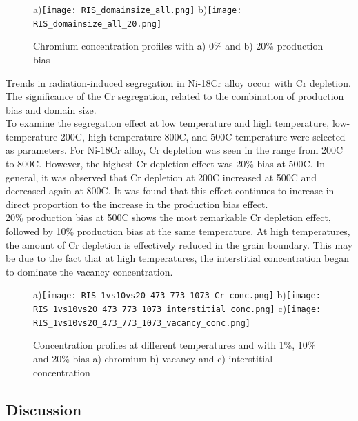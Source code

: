 \documentclass[utf8]{frontiersSCNS} %
\begin{document}
    \begin{figure}[h!]  %
        \centering
        a)\texttt{[image: RIS\_domainsize\_all.png]}
        b)\texttt{[image: RIS\_domainsize\_all\_20.png]}
        \caption{Chromium concentration profiles with a) 0\% and b) 20\% production bias }
        \label{figure:RIS_Cr_concentration}
    \end{figure}


        Trends in radiation-induced segregation in Ni-18Cr alloy occur with Cr depletion. The significance of the Cr segregation, related to the combination of production bias and domain size.\\

        To examine the segregation effect at low temperature and high temperature, low-temperature 200\degree C, high-temperature 800\degree C, and 500\degree C temperature were selected as parameters. For Ni-18Cr alloy, Cr depletion was seen in the range from 200\degree C to 800\degree C. However, the highest Cr depletion effect was 20\% bias at 500\degree C. In general, it was observed that Cr depletion at 200\degree C increased at 500\degree C and decreased again at 800\degree C. It was found that this effect continues to increase in direct proportion to the increase in the production bias effect.\\

        20\% production bias at 500\degree C shows the most remarkable Cr depletion effect, followed by 10\%  production bias at the same temperature. At high temperatures, the amount of Cr depletion is effectively reduced in the grain boundary. This may be due to the fact that at high temperatures, the interstitial concentration began to dominate the vacancy concentration.

    \begin{figure}[h!]  %
        \centering
        a)\texttt{[image: RIS\_1vs10vs20\_473\_773\_1073\_Cr\_conc.png]}
        b)\texttt{[image: RIS\_1vs10vs20\_473\_773\_1073\_interstitial\_conc.png]}
        c)\texttt{[image: RIS\_1vs10vs20\_473\_773\_1073\_vacancy\_conc.png]}
        \caption{Concentration profiles at different temperatures and with 1\%, 10\% and 20\% bias a) chromium b) vacancy and c) interstitial concentration}
        \label{figure:RIS_temperature}
    \end{figure}



\clearpage

  \subsection{Discussion} \hspace{10pt}
\end{document}
